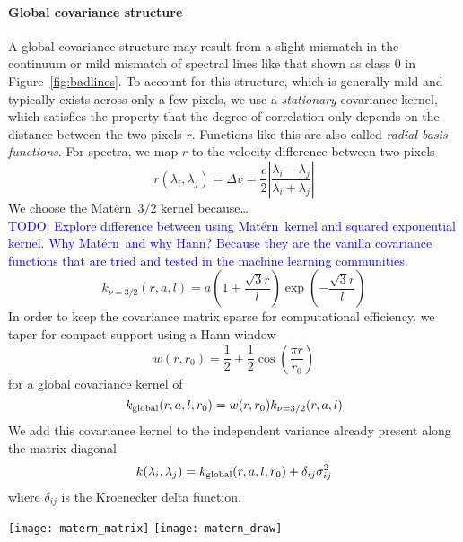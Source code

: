 \documentclass[preprint]{aastex} %
\newcommand{\matern}{Mat\'{e}rn}
\newcommand{\todo}[1]{ \textcolor{Blue}{\\TODO: #1}}
\begin{document}
\paragraph{Global covariance structure}
A global covariance structure may result from a slight mismatch in the continuum or mild mismatch of spectral lines like that shown as class 0 in Figure~\ref{fig:badlines}. To account for this structure, which is generally mild and typically exists across only a few pixels, we use a \emph{stationary} covariance kernel, which satisfies the property that the degree of correlation only depends on the distance between the two pixels $r$. Functions like this are also called \emph{radial basis functions}. For spectra, we map $r$ to the velocity difference between two pixels
\begin{equation}
  r(\lambda_i, \lambda_j) = \Delta v = \frac{c}{2} \left | \frac{\lambda_i - \lambda_j}{ \lambda_i + \lambda_j} \right |
\end{equation}
We choose the \matern\ $3/2$ kernel because\ldots
\todo{Explore difference between using \matern\ kernel and squared exponential kernel. Why \matern\ and why Hann? Because they are the vanilla covariance functions that are tried and tested in the machine learning communities.}
\begin{equation}
  k_{\nu = 3/2}(r, a, l) = a \left(1 + \frac{\sqrt{3} r}{l} \right ) \exp \left (- \frac{\sqrt{3} r}{l} \right )
\end{equation}
In order to keep the covariance matrix sparse for computational efficiency, we taper for compact support using a Hann window
\begin{equation}
  w(r, r_0) = \frac{1}{2} + \frac{1}{2} \cos \left( \frac{\pi r}{r_0} \right) 
\end{equation}
for a global covariance kernel of 
\begin{equation}
  k_{\rm global} (r, a, l, r_0) = w(r, r_0) k_{\nu = 3/2}(r, a, l) 
  \label{eqn:global}
\end{equation}
We add this covariance kernel to the independent variance already present along the matrix diagonal
\begin{equation}
  k(\lambda_i, \lambda_j) = k_{\rm global}(r, a, l, r_0) + \delta_{ij} \sigma_{ij}^2
\end{equation}
where $\delta_{ij}$ is the Kroenecker delta function.

\begin{figure*}[!htb]
\begin{center}
\texttt{[image: matern\_matrix]}
\texttt{[image: matern\_draw]}
\caption{\textbf{Left} a covariance matrix generated with the \matern\ kernel and typical parameters for our dataset. \textbf{Right} general spectroscopic residuals near a stellar continuum overlaid with a sample draw using the covariance matrix, showing that the two look similar in structure and amplitude. \protect \todo{Prettify these figures. Consistent labelling. Change color stretch so Matrix zeros are white.}}
\label{fig:matern}
\end{center}
\end{figure*}
\end{document}
